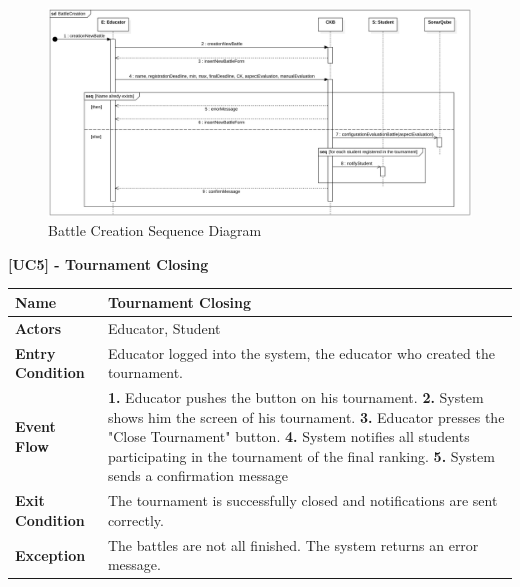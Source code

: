 \begin{figure}[h]
    \centering
    \includegraphics[scale=0.45]{images/SD/BattleCreationSD.png} 
    \caption{Battle Creation Sequence Diagram}
    \label{fig_BattleCreationSD}
\end{figure}


\clearpage
\raggedright
\textbf{[UC5] - Tournament Closing}
\begin{table}[h]
\begin{tabular}{|l|p{12cm}|} \hline 

\rule[-3mm]{0mm}{1cm}
\textbf{Name} & Tournament Closing\\ \hline 

\rule[-3mm]{0mm}{1cm}
\textbf{Actors} & Educator, Student  \\ \hline 

\rule[-3mm]{0mm}{1cm}
\textbf{Entry Condition} & Educator logged into the system, the educator who created the tournament.
\vspace{2pt}
\\ \hline 

\rule[-3mm]{0mm}{1cm}
\textbf{Event Flow} & 
\textbf{1.} Educator pushes the button on his tournament.
\vspace{4pt}
\newline
\textbf{2.} System shows him the screen of his tournament.
\vspace{4pt}
\newline
\textbf{3.} Educator presses the "Close Tournament" button.
\vspace{4pt}
\newline
\textbf{4.} System notifies all students participating in the tournament of the final ranking.
\vspace{4pt}
\newline
\textbf{5.} System sends a confirmation message

\\ \hline 

\rule[-3mm]{0mm}{1cm}
\textbf{Exit Condition} & The tournament is successfully closed and notifications are sent correctly. \\ \hline

\rule[-3mm]{0mm}{1cm}
\textbf{Exception} & The battles are not all finished. The system returns an error message. \\ \hline

\end{tabular}
\end{table}

